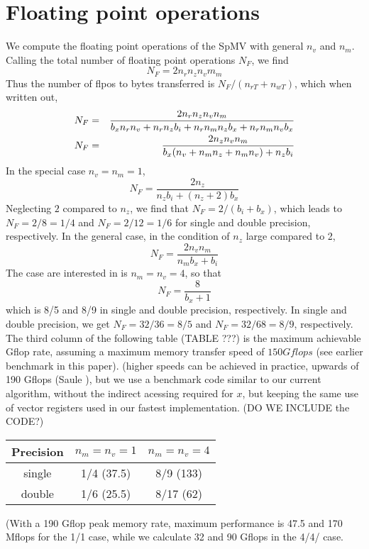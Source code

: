 \section{Floating point operations}
We compute the floating point operations of the SpMV with general $n_v$ and $n_m$. Calling the total number of floating point operations $N_F$, we find
$$
  N_F = 2 n_r n_z n_v m_m
$$
Thus the number of flpos to bytes transferred is $N_F / (n_{rT} + n_{wT})$, which when written out, 
\begin{eqnarray}
N_F &=& \frac{2 n_r n_z n_v n_m}{b_x n_r n_v  + n_r n_z b_i + n_r n_m n_z b_x + n_r n_m n_v b_x} \nonumber \\
N_F &=& \frac{2 n_z n_v n_m}{b_x ( n_v + n_m n_z + n_m n_v) + n_z b_i}  \nonumber \\
\end{eqnarray}
In the special case $n_v=n_m=1$, 
$$
N_F = \frac{2 n_z}{n_z b_i + (n_z +2) b_x}
$$
Neglecting $2$ compared to $n_z$, we find that $N_F = 2/(b_i+b_x)$, which leads to 
$N_F = 2/8=1/4$ and  $N_F=2/12=1/6$ for single and double precision, respectively. 
In the general case, in the condition of $n_z$ large compared to 2, 
$$
N_F =  \frac{2 n_v n_m}{n_m b_x + b_i}
$$ 
The case are interested in is $n_m=n_v=4$, so that
$$
N_F = \frac{8}{ b_x + 1}
$$
which is 8/5 and 8/9 in single and double precision, respectively. 
In single and double precision, we get $N_F=32/36=8/5$ and $N_F=32/68=8/9$, respectively.
The third column of the following table (TABLE ???) is the maximum achievable Gflop rate, assuming 
a maximum memory transfer speed of $150 Gflops$ (see earlier benchmark in this paper). 
(higher speeds can be achieved in practice,  upwards of 190 Gflops (Saule \etal\cite{}), but we use
a benchmark code similar to our current algorithm, without the indirect acessing required for $x$, but keeping the same use of vector registers used in our fastest implementation. (DO WE INCLUDE the CODE?)

\begin{center}
\begin{tabular}{|c|c|c|}
\hline
Precision & $n_m=n_v=1$ & $n_m=n_v=4$     \\
\hline
single    &  1/4  (37.5)     &   8/9 (133) \\
double    &  1/6  (25.5)     &   8/17 (62) \\
\hline
\end{tabular}
\end{center}
(With a 190 Gflop peak memory rate, maximum performance is 47.5 and 170 Mflops for the 1/1 case, while we calculate 32 and 90 Gflops in the 4/4/ case. 


